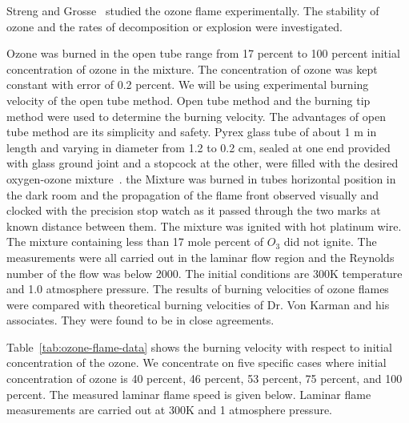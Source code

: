 Streng and Grosse~\cite{Streng} studied the ozone
flame experimentally. The stability of ozone and the rates of
decomposition or explosion were investigated.%
 
Ozone was burned in the open tube
range from 17 percent to 100 percent initial concentration of ozone in
the mixture. 
The concentration of ozone was kept constant with error of 0.2
percent. We will be using experimental
burning velocity of the open tube method. Open tube method and the burning tip method were used to determine the burning velocity. The advantages of open tube method are its simplicity and safety. 
Pyrex glass tube of about 1 m in length and varying in diameter from 1.2 to 0.2 cm, sealed at one end provided with glass ground joint and a stopcock at the other, were filled with the desired oxygen-ozone mixture~\cite{Streng}.
the Mixture was burned in tubes horizontal position in the dark room and the propagation of the flame front observed visually and clocked with the precision stop watch as it passed through the two marks at known distance between them. The mixture was ignited with hot platinum wire. The mixture containing less than 17 mole percent of $O_3$ did not ignite.   The measurements were all carried out in the laminar
flow region and the Reynolds number of the flow was below 2000. The
initial conditions are 300K temperature and 1.0 atmosphere
pressure. The results of burning velocities of ozone flames were
compared with theoretical burning velocities of Dr. Von Karman and his
associates. They were found to be in close agreements.



Table~\ref{tab:ozone-flame-data} shows the burning
velocity with respect to initial concentration of the ozone. We
concentrate on five specific cases where initial concentration of ozone
is 40 percent, 46 percent, 53 percent, 75 percent, and 100 percent. The
measured laminar flame speed is given below. Laminar flame
measurements are carried out at 300K and 1 atmosphere pressure.

